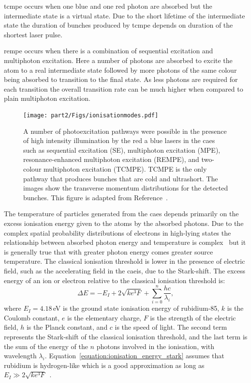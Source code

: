 \Gls{tcmpe} occurs when one blue and one red photon are absorbed but the intermediate state is a virtual state.
Due to the short lifetime of the intermediate state the duration of bunches produced by \gls{tcmpe} depends on duration of the shortest laser pulse.

\Gls{rempe} occurs when there is a combination of sequential excitation and multiphoton excitation.
Here a number of photons are absorbed to excite the atom to a real intermediate state followed by more photons of the same colour being absorbed to transition to the final state.
As less photons are required for each transition the overall transition rate can be much higher when compared to plain multiphoton excitation.

\begin{figure}
    \center
    \texttt{[image: part2/Figs/ionisationmodes.pdf]}
    \caption[Photoexcitation pathways.]{A number of photoexcitation pathways were possible in the presence of high intensity illumination by the red a blue lasers in the \gls{caes} such as sequential excitation (SE), multiphoton excitation (MPE), resonance-enhanced multiphoton excitation (REMPE), and two-colour multiphoton excitation (TCMPE). TCMPE is the only pathway that produces bunches that are cold and ultrashort. The images show the transverse momentum distributions for the detected bunches.
    This figure is adapted from Reference~\cite{speirs_electron_2017}.}
    \label{figure:ionisation_modes}
\end{figure}

The temperature of particles generated from the \gls{caes} depends primarily on the excess ionisation energy given to the atoms by the absorbed photons.
Due to the complex spatial probability distributions of electrons in high-lying states the relationship between absorbed photon energy and temperature is complex~\cite{mcculloch_high-coherence_2013} but it is generally true that with greater photon energy comes greater source temperature.
The classical ionisation threshold is lower in the presence of electric field, such as the accelerating field in the \gls{caeis}, due to the Stark-shift.
The excess energy of an ion or electron relative to the classical ionisation threshold is:
\begin{equation}\label{equation:ionisation_energy_stark}
\Delta E = -E_I + 2\sqrt{ke^3F} + \sum_{i=0}^{n}{\frac{hc}{\lambda_i}},
\end{equation}
where $E_I=4.18$\,eV is the ground state ionisation energy of rubidium-85, $k$ is the Coulomb constant, $e$ is the elementary charge, $F$ is the strength of the electric field, $h$ is the Planck constant, and $c$ is the speed of light.
The second term represents the Stark-shift of the classical ionisation threshold, and the last term is the sum of the energy of the $n$ photons involved in the ionisation, with wavelength $\lambda_i$.
Equation~\ref{equation:ionisation_energy_stark} assumes that rubidium is hydrogen-like which is a good approximation as long as $E_I \gg 2\sqrt{ke^3F}$~\cite{gallagher_rydberg_2005}.

